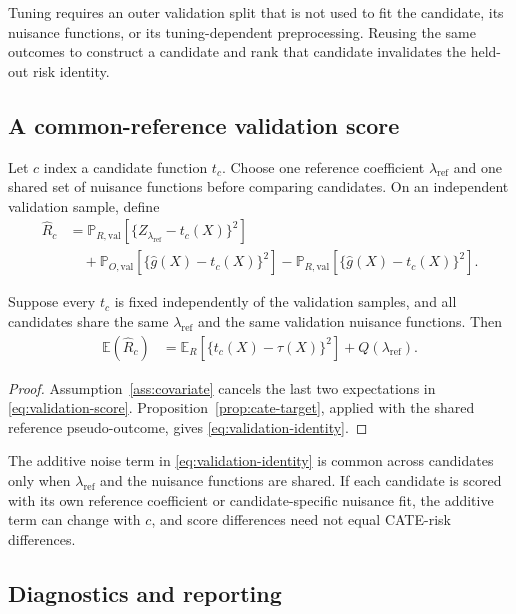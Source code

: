 Tuning requires an outer validation split that is not used to fit the candidate, its nuisance functions, or its tuning-dependent preprocessing. Reusing the same outcomes to construct a candidate and rank that candidate invalidates the held-out risk identity.

\subsection{A common-reference validation score}

Let $c$ index a candidate function $t_c$. Choose one reference coefficient $\lambda_{\mathrm{ref}}$ and one shared set of nuisance functions before comparing candidates. On an independent validation sample, define
\begin{align}
\widehat R_c
&=
\mathbb P_{R,\mathrm{val}}
[
\{Z_{\lambda_{\mathrm{ref}}}-t_c(X)\}^2
]
\\
&\quad+
\mathbb P_{O,\mathrm{val}}
[
\{\widehat{g}(X)-t_c(X)\}^2
]
-
\mathbb P_{R,\mathrm{val}}
[
\{\widehat{g}(X)-t_c(X)\}^2
].
\label{eq:validation-score}
\end{align}

\begin{proposition}
\label{prop:validation}
Suppose every $t_c$ is fixed independently of the validation samples, and all candidates share the same $\lambda_{\mathrm{ref}}$ and the same validation nuisance functions. Then
\begin{align}
\mathbb E(\widehat R_c)
&=
\mathbb E_R[
\{t_c(X)-\tau(X)\}^2
]
+
Q(\lambda_{\mathrm{ref}}).
\label{eq:validation-identity}
\end{align}
\end{proposition}

\begin{proof}
Assumption~\ref{ass:covariate} cancels the last two expectations in \eqref{eq:validation-score}. Proposition~\ref{prop:cate-target}, applied with the shared reference pseudo-outcome, gives \eqref{eq:validation-identity}.
\end{proof}

The additive noise term in \eqref{eq:validation-identity} is common across candidates only when $\lambda_{\mathrm{ref}}$ and the nuisance functions are shared. If each candidate is scored with its own reference coefficient or candidate-specific nuisance fit, the additive term can change with $c$, and score differences need not equal CATE-risk differences.

\subsection{Diagnostics and reporting}

